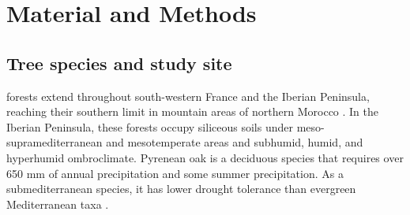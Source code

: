 \section{Material and Methods}\label{sec:dendro:MatMet}
\subsection{Tree species and study site}\label{sec:dendro:StudyArea}
\Qpy forests extend throughout south-western France and the Iberian Peninsula, reaching their southern limit in mountain areas of northern Morocco \autocite{Franco1990Quercus}. In the Iberian Peninsula, these forests occupy siliceous soils under meso-supramediterranean and mesotemperate areas and subhumid, humid, and hyperhumid ombroclimate. Pyrenean oak is a deciduous species that requires over 650 mm of annual precipitation and some summer precipitation. As a submediterranean species, it has lower drought tolerance than evergreen Mediterranean taxa \autocite{delRioetal2007BioclimaticAnalysis}.

